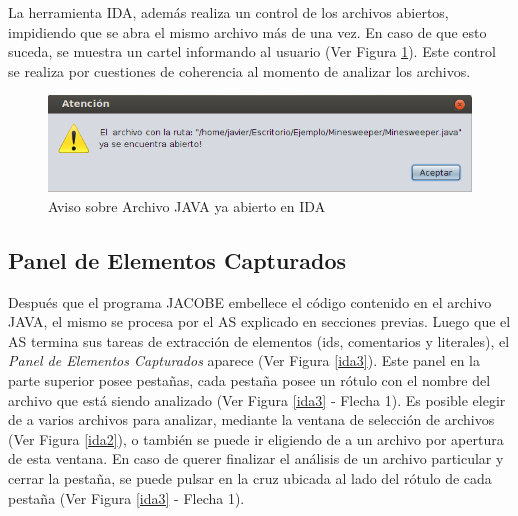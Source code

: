 La herramienta IDA, además realiza un control de los archivos abiertos, impidiendo que se abra el mismo archivo más de una vez. En caso de que esto suceda, se muestra un cartel informando al usuario (Ver Figura \ref{idaWar2}). Este control se realiza por cuestiones de coherencia al momento de analizar los archivos.


\begin{figure}[t] %
\centerline{%
\includegraphics[scale= 0.8]{./cap4/ida_war_02.png}
}
\caption{Aviso sobre Archivo JAVA ya abierto en IDA}
\label{idaWar2}
\end{figure}

\subsection{Panel de Elementos Capturados}

Después que el programa JACOBE embellece el código contenido en el archivo JAVA,
el mismo se procesa por el AS explicado en secciones previas. Luego que el AS termina sus tareas de extracción de elementos (ids, comentarios y literales), el \textit{Panel de Elementos Capturados} aparece (Ver Figura \ref{ida3}). Este panel en la parte superior posee pestañas, cada pestaña posee un rótulo con el nombre del archivo que está siendo analizado (Ver Figura \ref{ida3} - Flecha 1). Es posible elegir de a varios archivos para analizar, mediante la ventana de selección de archivos (Ver Figura \ref{ida2}), o también se puede ir eligiendo de a un archivo por apertura de esta ventana.  En caso de querer finalizar el análisis de un archivo particular y cerrar la pestaña, se puede pulsar en la cruz ubicada al lado del rótulo de cada pestaña (Ver Figura \ref{ida3} - Flecha 1).

